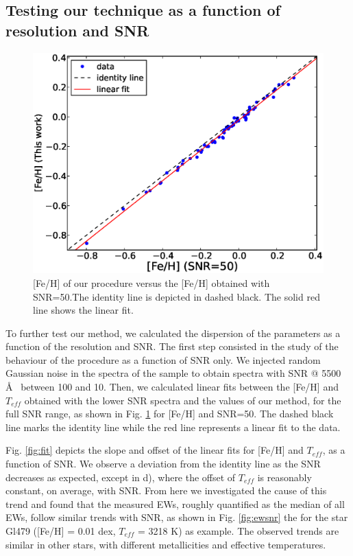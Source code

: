 \documentclass[referee]{aa}
\begin{document}
\subsection{Testing our technique as a function of resolution and SNR}
\label{sec:testcal}

\begin{figure}[]
\begin{center}
\includegraphics[scale=0.40]{pics/fehfehsnr.eps}
\end{center}
\caption{[Fe/H] of our procedure versus the [Fe/H] obtained with SNR=50.The identity line is depicted in dashed black. The solid red line shows the linear fit.}
\label{fig:fehfehsnr}
\end{figure}



To further test our method, we calculated the dispersion of the parameters as a function of the resolution and SNR. The first step consisted in the study of the behaviour of the procedure as a function of SNR only. We injected random Gaussian noise in the spectra of the sample to obtain spectra with SNR @ 5500 \AA~ between 100 and 10. Then, we calculated linear fits between the [Fe/H] and $T_{eff}$ obtained with the lower SNR spectra and the values of our method, for the full SNR range, as shown in Fig. \ref{fig:fehfehsnr} for [Fe/H] and SNR=50. The dashed black line marks the identity line while the red line represents a linear fit to the data. 



Fig. \ref{fig:fit} depicts the slope and offset of the linear fits for [Fe/H] and $T_{eff}$, as a function of SNR. We observe a deviation from the identity line as the SNR decreases as expected, except in d), where the offset of $T_{eff}$ is reasonably constant, on average, with SNR. From here we investigated the cause of this trend and found that the measured EWs, roughly quantified as the median of all EWs, follow similar trends with SNR, as shown in Fig. \ref{fig:ewsnr} the for the star Gl479 ([Fe/H] = 0.01 dex, $T_{eff}$ = 3218 K) as example. The observed trends are similar in other stars, with different metallicities and effective temperatures.
\end{document}
